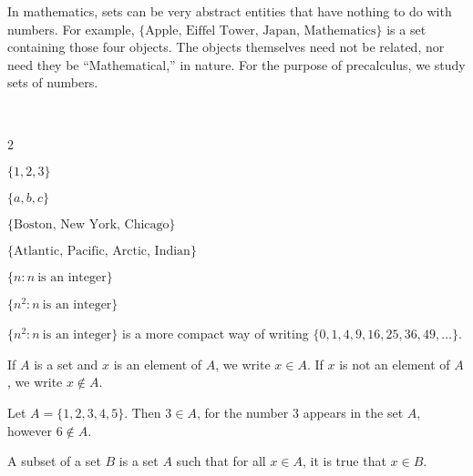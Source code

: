 \documentclass[crop=false,class=article,oneside]{standalone}
\begin{document}
        \begin{remark}
            In mathematics, sets can be very abstract entities that
            have nothing to do with numbers. For example,
            $\{\textrm{Apple, Eiffel Tower, Japan, Mathematics}\}$
            is a set containing those four objects. The objects
            themselves need not be related, nor need they be
            ``Mathematical,'' in nature. For the purpose of
            precalculus, we study sets of numbers.
        \end{remark}
        \begin{example}
            \
            \begin{enumerate}
            \end{enumerate}
        \end{example}
        \begin{remark}
            $\{n^2: n\ \textrm{is an integer}\}$ is a more compact way
            of writing $\{0,1,4,9,16,25,36,49,\hdots\}$.
        \end{remark}
        \begin{notation}
            If $A$ is a set and $x$ is an element of $A$,
            we write $x\in{A}$. If $x$ is not an element of $A$,
            we write $x\notin{A}$.
        \end{notation}
        \begin{example}
            Let $A = \{1,2,3,4,5\}$. Then $3\in{A}$, for the number
            $3$ appears in the set $A$, however $6\notin{A}$.
        \end{example}
        \begin{definition}
            A subset of a set $B$ is a set $A$ such that for all
            $x\in{A}$, it is true that $x\in{B}$.
        \end{definition}
\end{document}

